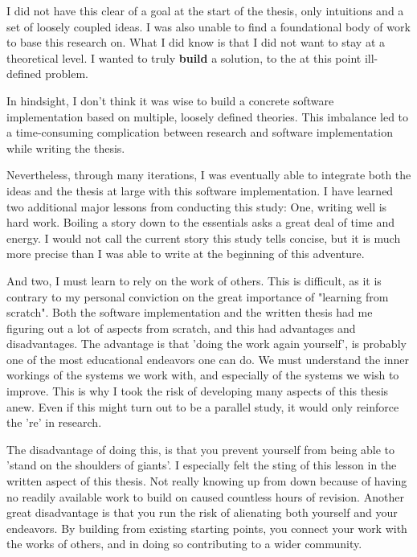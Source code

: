 I did not have this clear of a goal at the start of the thesis, only intuitions and a set of loosely coupled ideas.
I was also unable to find a foundational body of work to base this research on. 
What I did know is that I did not want to stay at a theoretical level. 
I wanted to truly \textbf{build} a solution, to the at this point ill-defined problem. 

In hindsight, I don't think it was wise to build a concrete software implementation based on multiple, loosely defined theories. 
This imbalance led to a time-consuming complication between research and software implementation while writing the thesis.

Nevertheless, through many iterations, I was eventually able to integrate both the ideas and the thesis at large with this software implementation.
I have learned two additional major lessons from conducting this study: 
One, writing well is hard work. 
Boiling a story down to the essentials asks a great deal of time and energy. 
I would not call the current story this study tells concise, but it is much more precise than I was able to write at the beginning of this adventure.

And two, I must learn to rely on the work of others.
This is difficult, as it is contrary to my personal conviction on the great importance of "learning from scratch".
Both the software implementation and the written thesis had me figuring out a lot of aspects from scratch, and this had advantages and disadvantages.
The advantage is that 'doing the work again yourself', is probably one of the most educational endeavors one can do. 
We must understand the inner workings of the systems we work with, and especially of the systems we wish to improve. 
This is why I took the risk of developing many aspects of this thesis anew. 
Even if this might turn out to be a parallel study, it would only reinforce the 're' in research. 

The disadvantage of doing this, is that you prevent yourself from being able to 'stand on the shoulders of giants'.
I especially felt the sting of this lesson in the written aspect of this thesis. 
Not really knowing up from down because of having no readily available work to build on caused countless hours of revision.
Another great disadvantage is that you run the risk of alienating both yourself and your endeavors. 
By building from existing starting points, you connect your work with the works of others, and in doing so contributing to a wider community.

